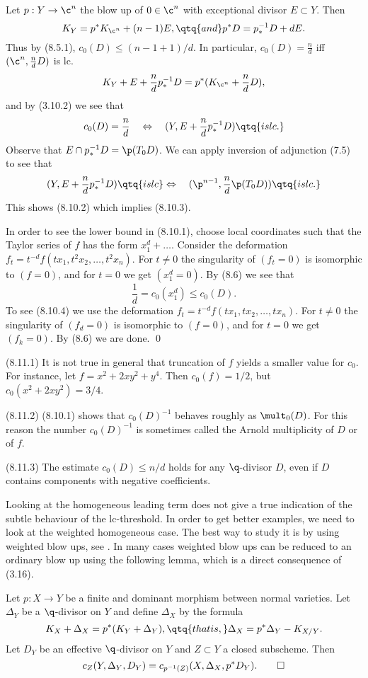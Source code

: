 \demop  Let  $p:Y\to \c^n$ 
 the blow up of $0\in {\c^n}$ with exceptional divisor $E\subset Y$. 
Then
$$
K_Y=p^*K_{\c^n}+(n-1)E,\qtq{and}  p^*D=p^{-1}_*D+dE.
$$
Thus by (8.5.1), $c_0(D)\leq (n-1+1)/d$.
In particular, 
$c_0(D)= \frac{n}{d}$ iff $(\c^n, \frac{n}{d}D)$ is lc. 
$$
K_Y+E+\frac{n}{d}p^{-1}_*D=p^*(K_{\c^n}+\frac{n}{d}D),
$$
and by (3.10.2) we see that 
$$
c_0(D)= \frac{n}{d}\quad\Leftrightarrow \quad(Y,E+\frac{n}{d}p^{-1}_*D)\qtq{is
lc.}
$$
Observe that  $E\cap p^{-1}_*D=\p(T_0D)$. 
We can apply inversion of adjunction (7.5) to see that 
$$
(Y,E+\frac{n}{d}p^{-1}_*D)\qtq{is lc}\Leftrightarrow \quad
(\p^{n-1}, \frac{n}{d}\p(T_0D))\qtq{is lc.}
$$
This shows (8.10.2) which implies (8.10.3). 

In order to see the lower bound in (8.10.1), choose  
local coordinates  such that  the Taylor series of
$f$ has the form
$x_1^d+\dots$. Consider the deformation
$f_t=t^{-d}f(tx_1,t^2x_2,\dots,t^2x_n)$.  For $t\neq 0$ the singularity of
$(f_t=0)$  is isomorphic to $(f=0)$, and for $t=0$ we get $(x_1^d=0)$.
By (8.6) we see that
$$
\frac{1}{d}=c_0(x_1^d)\leq c_0(D).
$$
To see (8.10.4)  we use  the deformation
$f_t=t^{-d}f(tx_1,tx_2,\dots,tx_n)$.  For $t\neq 0$ the singularity of
$(f_d=0)$  is isomorphic to $(f=0)$, and for $t=0$ we get $(f_k=0)$.
By (8.6) we are done. \qed
\enddemo


  (8.11.1) It is not true in general that truncation of $f$
yields  a smaller value  for $c_0$. For instance, let $f=x^2+2xy^2+y^4$. Then
$c_0(f)=1/2$, but  $c_0(x^2+2xy^2)=3/4$.

(8.11.2)   (8.10.1) shows that $c_0(D)^{-1}$ behaves roughly as
$\mult_0(D)$. For this reason the number $c_0(D)^{-1}$
is sometimes called the Arnold multiplicity of $D$ or of $f$. 

(8.11.3) The estimate $c_0(D)\leq n/d$ holds for any $\q$-divisor $D$, even
if $D$ contains components with negative coefficients.
\enddemo


Looking at the homogeneous leading term does not give a true indication of the
subtle behaviour of the lc-threshold. In order to get better examples, we
need to look at the weighted homogeneous case. The best way to study it is by
using weighted blow ups, see \cite{Reid80,87}. In many cases weighted blow
ups can be reduced to an ordinary blow up using the following lemma, which is
a direct consequence of (3.16). 

 Let $p:X\to Y$ be a  finite and
dominant morphism between normal varieties. Let $\Delta_Y$ be a $\q$-divisor on
$Y$ and define $\Delta_X$ by the formula
$$
K_X+\Delta_X=p^*(K_Y+\Delta_Y),\qtq{that is,} \Delta_X=p^*\Delta_Y-K_{X/Y}.
$$
Let $D_Y$ be an effective  $\q$-divisor on $Y$ and $Z\subset Y$ a closed
subscheme. Then 
$$
c_Z(Y,\Delta_Y, D_Y)=c_{p^{-1}(Z)}(X,\Delta_X, p^*D_Y).\qed
$$
\endproclaim 

